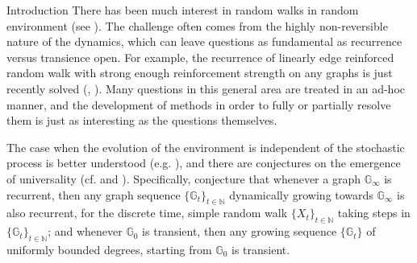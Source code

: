 \documentclass[12pt,reqno]{amsart}
\numberwithin{equation}{section}
\theoremstyle{definition}
\begin{document}
\begin{section}{Introduction}
There has been much interest in random walks in random environment (see \cite{HMZ}). The challenge often comes from the highly non-reversible nature of the dynamics, which  can leave questions as fundamental as recurrence versus transience open. For example, the recurrence of linearly edge reinforced random walk with strong enough reinforcement strength on any graphs is just recently solved (\cite{ACK}, \cite{ST}). Many questions in this general area are treated in an ad-hoc manner, and the development of methods in order to fully or partially resolve them is just as interesting as the questions themselves.  

The case when the evolution of the environment is independent of the stochastic process is better understood (e.g. \cite{DKL}), and there are conjectures on the emergence of universality (cf. \cite[Conj. 7.1]{ABGK} and \cite[Conj. 1.2, 1.8, 1.10]{DHS}). Specifically, \cite{DHS} conjecture that whenever a graph ${\mathbb{G}}_\infty$ 
is recurrent, then any graph sequence $\{{\mathbb{G}}_t\}_{t\in{\mathbb{N}}}$ dynamically growing towards 
${\mathbb{G}}_\infty$ is also recurrent, for the discrete time, simple random walk $\{X_t\}_{t\in{\mathbb{N}}}$ 
taking steps in $\{{\mathbb{G}}_t\}_{t\in{\mathbb{N}}}$; and whenever ${\mathbb{G}}_0$ is transient, then 
any growing sequence $\{{\mathbb{G}}_t\}$ of uniformly bounded degrees,
starting from ${\mathbb{G}}_0$ is transient.
 

\end{section}
\end{document}

